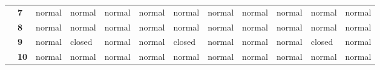\documentclass[12pt]{article}
\begin{document}
\begin{table}[]
{\begin{tabular}{clllllllllll}
			\multicolumn{1}{c|}{}                                   & \multicolumn{1}{l|}{\textbf{7}}  & \multicolumn{1}{l|}{\cellcolor[HTML]{FFFC9E}normal} & \multicolumn{1}{l|}{\cellcolor[HTML]{FFFC9E}normal} & \multicolumn{1}{l|}{\cellcolor[HTML]{FFFC9E}normal} & \multicolumn{1}{l|}{\cellcolor[HTML]{FFFC9E}normal} & \multicolumn{1}{l|}{\cellcolor[HTML]{FFFC9E}normal} & \multicolumn{1}{l|}{\cellcolor[HTML]{FFFC9E}normal} & \multicolumn{1}{l|}{\cellcolor[HTML]{FFFC9E}normal} & \multicolumn{1}{l|}{\cellcolor[HTML]{FFFC9E}normal} & \multicolumn{1}{l|}{\cellcolor[HTML]{FFFC9E}normal} & \multicolumn{1}{l|}{\cellcolor[HTML]{FFFC9E}normal} \\ \cline{2-12} 
			\multicolumn{1}{c|}{}                                   & \multicolumn{1}{l|}{\textbf{8}}  & \multicolumn{1}{l|}{\cellcolor[HTML]{FFFC9E}normal} & \multicolumn{1}{l|}{\cellcolor[HTML]{FFFC9E}normal} & \multicolumn{1}{l|}{\cellcolor[HTML]{FFFC9E}normal} & \multicolumn{1}{l|}{\cellcolor[HTML]{FFFC9E}normal} & \multicolumn{1}{l|}{\cellcolor[HTML]{FFFC9E}normal} & \multicolumn{1}{l|}{\cellcolor[HTML]{FFFC9E}normal} & \multicolumn{1}{l|}{\cellcolor[HTML]{FFFC9E}normal} & \multicolumn{1}{l|}{\cellcolor[HTML]{FFFC9E}normal} & \multicolumn{1}{l|}{\cellcolor[HTML]{FFFC9E}normal} & \multicolumn{1}{l|}{\cellcolor[HTML]{FFFC9E}normal} \\ \cline{2-12} 
			\multicolumn{1}{c|}{}                                   & \multicolumn{1}{l|}{\textbf{9}}  & \multicolumn{1}{l|}{\cellcolor[HTML]{FFFC9E}normal} & \multicolumn{1}{l|}{\cellcolor[HTML]{FD6864}closed} & \multicolumn{1}{l|}{\cellcolor[HTML]{FFFC9E}normal} & \multicolumn{1}{l|}{\cellcolor[HTML]{FFFC9E}normal} & \multicolumn{1}{l|}{\cellcolor[HTML]{FD6864}closed} & \multicolumn{1}{l|}{\cellcolor[HTML]{FFFC9E}normal} & \multicolumn{1}{l|}{\cellcolor[HTML]{FFFC9E}normal} & \multicolumn{1}{l|}{\cellcolor[HTML]{FFFC9E}normal} & \multicolumn{1}{l|}{\cellcolor[HTML]{FD6864}closed} & \multicolumn{1}{l|}{\cellcolor[HTML]{FFFC9E}normal} \\ \cline{2-12} 
			\multicolumn{1}{c|}{}                                   & \multicolumn{1}{l|}{\textbf{10}} & \multicolumn{1}{l|}{\cellcolor[HTML]{FFFC9E}normal} & \multicolumn{1}{l|}{\cellcolor[HTML]{FFFC9E}normal} & \multicolumn{1}{l|}{\cellcolor[HTML]{FFFC9E}normal} & \multicolumn{1}{l|}{\cellcolor[HTML]{FFFC9E}normal} & \multicolumn{1}{l|}{\cellcolor[HTML]{FFFC9E}normal} & \multicolumn{1}{l|}{\cellcolor[HTML]{FFFC9E}normal} & \multicolumn{1}{l|}{\cellcolor[HTML]{FFFC9E}normal} & \multicolumn{1}{l|}{\cellcolor[HTML]{FFFC9E}normal} & \multicolumn{1}{l|}{\cellcolor[HTML]{FFFC9E}normal} & \multicolumn{1}{l|}{\cellcolor[HTML]{FFFC9E}normal} \\ \cline{2-12} 

\end{tabular}}
\end{table}
\end{document}

